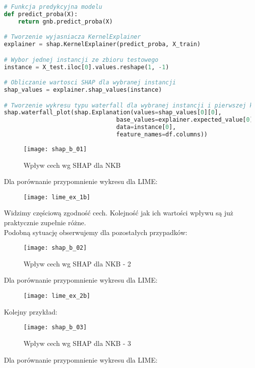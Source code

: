 \begin{lstlisting}[language=Python, caption=Definicja explainera dla SHAP]
# Funkcja predykcyjna modelu
def predict_proba(X):
    return gnb.predict_proba(X)

# Tworzenie wyjasniacza KernelExplainer
explainer = shap.KernelExplainer(predict_proba, X_train)

# Wybor jednej instancji ze zbioru testowego
instance = X_test.iloc[0].values.reshape(1, -1)

# Obliczanie wartosci SHAP dla wybranej instancji
shap_values = explainer.shap_values(instance)

# Tworzenie wykresu typu waterfall dla wybranej instancji i pierwszej klasy
shap.waterfall_plot(shap.Explanation(values=shap_values[0][0], 
                                base_values=explainer.expected_value[0], 
                                data=instance[0], 
                                feature_names=df.columns))
\end{lstlisting}

\begin{figure}[H]
    \centering
    \texttt{[image: shap\_b\_01]}
    \caption{Wpływ cech wg SHAP dla NKB}
    \label{fig:shap_b_01}
\end{figure}
Dla porównanie przypomnienie wykresu dla LIME:

\begin{figure}[H]
    \centering
    \texttt{[image: lime\_ex\_1b]}
\end{figure}

Widzimy częściową zgodność cech. Kolejność jak ich wartości wpływu są już praktycznie zupełnie różne.\\

Podobną sytuację obserwujemy dla pozostałych przypadków:
\begin{figure}[H]
    \centering
    \texttt{[image: shap\_b\_02]}
    \caption{Wpływ cech wg SHAP dla NKB - 2}
    \label{fig:shap_b_02}
\end{figure}
Dla porównanie przypomnienie wykresu dla LIME:

\begin{figure}[H]
    \centering
    \texttt{[image: lime\_ex\_2b]}
\end{figure}

Kolejny przykład:
\begin{figure}[H]
    \centering
    \texttt{[image: shap\_b\_03]}
    \caption{Wpływ cech wg SHAP dla NKB - 3}
    \label{fig:shap_b_03}
\end{figure}
Dla porównanie przypomnienie wykresu dla LIME:


